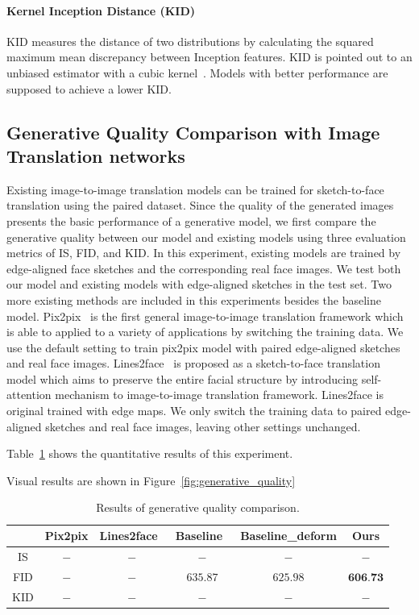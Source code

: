 \paragraph{Kernel Inception Distance (KID)}
KID measures the distance of two distributions by calculating the squared maximum mean discrepancy between Inception features. KID is pointed out to an unbiased estimator with a cubic kernel~\cite{KID}. Models with better performance are supposed to achieve a lower KID.

\subsection{Generative Quality Comparison with Image Translation networks}

Existing image-to-image translation models can be trained for sketch-to-face translation using the paired dataset. 
Since the quality of the generated images presents the basic performance of a generative model, we first compare the generative quality between our model and existing models using three evaluation metrics of IS, FID, and KID. In this experiment, existing models are trained by edge-aligned face sketches and the corresponding real face images. 
We test both our model and existing models with edge-aligned sketches in the test set. Two more existing methods are included in this experiments besides the baseline model. Pix2pix~\cite{pix2pix} is the first general image-to-image translation framework which is able to applied to a variety of applications by switching the training data. We use the default setting to train pix2pix model with paired edge-aligned sketches and real face images. Lines2face~\cite{Lines2Face} is proposed as a sketch-to-face translation model which aims to preserve the entire facial structure by introducing self-attention mechanism to image-to-image translation framework. Lines2face is original trained with edge maps. We only switch the training data to paired edge-aligned sketches and real face images, leaving other settings unchanged.

Table~\ref{tab:generative_quality} shows the quantitative results of this experiment. 

Visual results are shown in Figure~\ref{fig:generative_quality}

\begin{table}[h]
	\centering	
	\caption{Results of generative quality comparison.}
	\begin{tabular}{|c|c|c|c|c|c|}\hline
		& Pix2pix \cite{pix2pix} & Lines2face~\cite{Lines2Face} & Baseline~\cite{pix2pixHD} & Baseline\_deform & Ours \\\hline
		IS & $-$ & $-$ & $-$ & $-$ & $-$\\\hline
		FID & $-$ & $-$ & $635.87$ & $625.98$ & $\textbf{606.73}$\\\hline
		KID & $-$ & $-$ & $-$ & $-$ & $-$\\\hline
	\end{tabular}
	\label{tab:generative_quality}
\end{table} 

